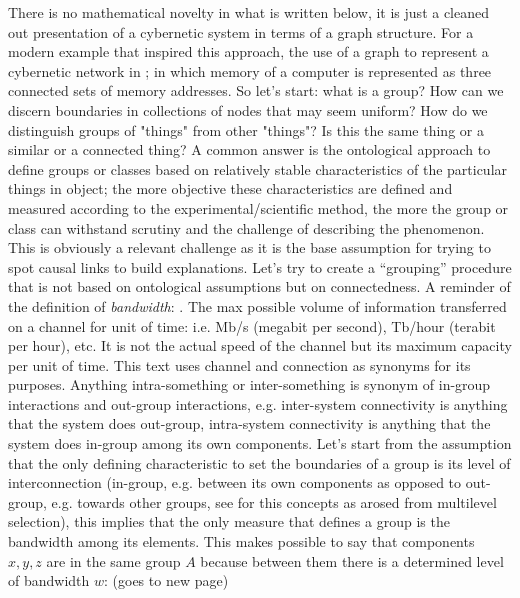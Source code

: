 \documentclass[14pt,a4paper]{extarticle}
\begin{document}
\newline
\hspace*{15mm}There is no mathematical novelty in what is written below, it is just a cleaned out presentation of a cybernetic system in terms of a graph structure. For a modern example that inspired this approach, the use of a graph to represent a cybernetic network in \cite{dijkstra1978fly}; in which memory of a computer is represented as three connected sets of memory addresses.
\newline
\hspace*{15mm}So let’s start: what  is a group? How can we discern boundaries in collections of nodes that may seem uniform? How do we distinguish groups of "things" from other "things"? Is this the same thing or a similar or a connected thing? A common answer is the ontological approach to define groups or classes based on relatively stable characteristics of the particular things in object; the more objective these characteristics are defined and measured according to the experimental/scientific method, the more the group or class can withstand scrutiny and the challenge of describing the phenomenon. This is obviously a relevant challenge as it is the base assumption for trying to spot causal links to build explanations. Let’s try to create a “grouping” procedure that is not based on ontological assumptions but on connectedness.
\newline
\hspace*{15mm}A reminder of the definition of \textit{bandwidth}:  \cite{WIKIbandwidth}. The max possible volume of information transferred on a channel for unit of time: i.e. Mb/s (megabit per second), Tb/hour (terabit per hour), etc. It is not the actual speed of the channel but its maximum capacity per unit of time.
\newline
This text uses channel and connection as synonyms for its purposes. Anything intra-something or inter-something is synonym of in-group interactions and out-group interactions, e.g. inter-system connectivity is anything that the system does out-group, intra-system connectivity is anything that the system does in-group among its own components. Let’s start from the assumption that the only defining characteristic to set the boundaries of a group is its level of interconnection (in-group, e.g. between its own components as opposed to out-group, e.g. towards other groups, see \cite{SLOANdarwin} for this concepts as arosed from multilevel selection), this implies that the only measure that defines a group is the bandwidth among its elements. This makes possible to say that components \(x, y, z\)  are in the same group \(A\) because between them there is a determined level of bandwidth \(w\): (goes to new page)
\end{document}

